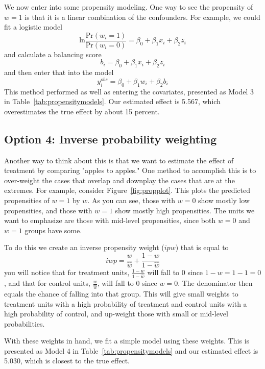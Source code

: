 We now enter into some propensity modeling. One way to see the propensity of $w=1$ is that it is a linear combination of the confounders. For example, we could fit a logistic model
\[
\mbox{ln}\frac{\mbox{Pr}\left(w_i=1\right)}{\mbox{Pr}\left(w_i=0\right)}=\beta_0+\beta_1x_i+\beta_2z_i
\]
and calculate a balancing score
\[
b_i=\beta_0+\beta_1x_i+\beta_2z_i
\]
and then enter that into the model
\[
y_i^{obs}=\beta_0+\beta_1w_i+\beta_2b_i
\]
This method performed as well as entering the covariates, presented as Model 3 in Table~\ref{tab:propensitymodels}. Our estimated effect is 5.567, which overestimates the true effect by about 15 percent.

\subsection{Option 4: Inverse probability weighting}

Another way to think about this is that we want to estimate the effect of treatment by comparing "apples to apples." One method to accomplish this is to over-weight the cases that overlap and downplay the cases that are at the extremes. For example, consider Figure~\ref{fig:propplot}. This plots the predicted propensities of $w=1$ by $w$. As you can see, those with $w=0$ show mostly low propensities, and those with $w=1$ show mostly high propensities. The units we want to emphasize are those with mid-level propensities, since both $w=0$ and $w=1$ groups have some.

To do this we create an inverse propensity weight ($ipw$) that is equal to
\begin{equation}
iwp=\frac{w}{\hat{w}}+\frac{1-w}{1-\hat{w}}
\end{equation}
you will notice that for treatment units, $\frac{1-w}{1-\hat{w}}$ will fall to 0 since $1-w=1-1=0$, and that for control units, $\frac{w}{\hat{w}}$, will fall to 0 since $w=0$. The denominator then equals the chance of falling into that group. This will give small weights to treatment units with a high probability of treatment and control units with a high probability of control, and up-weight those with small or mid-level probabilities.

With these weights in hand, we fit a simple model using these weights. This is presented as Model 4 in Table~\ref{tab:propensitymodels} and our estimated effect is 5.030, which is closest to the true effect.

